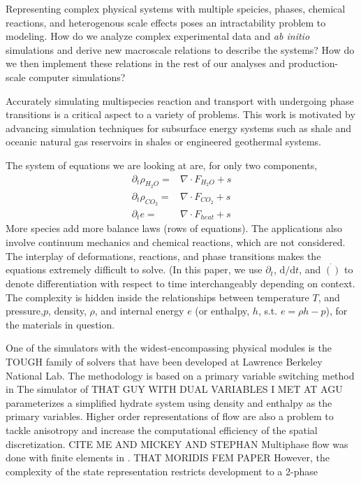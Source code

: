 \documentclass[]{article}
\begin{document}
Representing complex physical systems with multiple speicies, phases,
chemical reactions, and heterogenous scale effects poses an
intractability problem to modeling. How do we analyze complex
experimental data and \emph{ab initio} simulations and derive new
macroscale relations to describe the systems? How do we then implement
these relations in the rest of our analyses and production-scale
computer simulations?

Accurately simulating multispecies reaction and transport with
undergoing phase transitions is a critical aspect to a variety of
problems.
This work is motivated by advancing simulation techniques for subsurface energy systems such as shale
and oceanic natural gas reservoirs in shales or engineered geothermal
systems.


The system of equations we are looking at are, for only two components,
\begin{align}
  \partial_t \rho_{H_2O} =& \nabla \cdot F_{H_2O} + s \\
  \partial_t \rho_{CO_2} =& \nabla \cdot F_{CO_2} + s \\
  \partial_t e =& \nabla \cdot F_{heat} + s
\end{align}
More species add more balance laws (rows of equations). The applications also involve continuum
mechanics and chemical reactions, which are not considered. The interplay of deformations,
reactions, and phase transitions makes the equations extremely difficult
to solve. \cite{queiruga2018millstone}
(In this paper, we use $\partial_t$, $\mathrm{d}/\mathrm{d}t$,
and $\dot{()}$ to denote differentiation with respect to time
interchangeably depending on context.
The complexity is hidden inside the relationships between temperature
$T$, and pressure,$p$, density, $\rho$, and internal energy $e$ (or
enthalpy, $h$, s.t. $e=\rho h - p$), 
for the materials in question.

One of the simulators with the widest-encompassing physical modules is
the TOUGH family of solvers that have been developed at Lawrence
Berkeley National Lab.
The methodology is based on a primary variable switching method in 
The simulator of THAT GUY WITH DUAL VARIABLES I MET AT AGU
parameterizes a simplified hydrate system using density and enthalpy
as the primary variables.
Higher order representations of flow are also a problem to tackle
anisotropy and increase the computational efficiency of the spatial
discretization. CITE ME AND MICKEY AND STEPHAN
Multiphase flow was done with finite elements in \cite{YANG2014417}.
THAT MORIDIS FEM PAPER
However, the complexity of the state representation restricts
development to a 2-phase
\end{document}

